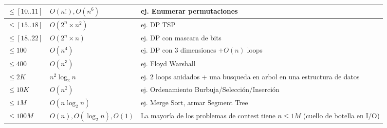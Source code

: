 \begin{center}
\footnotesize
{
  \begin{xtabular}{|C{.15\columnwidth}|C{.25\columnwidth}|L{.55\columnwidth}|}
  \texttt{$\leq[10..11]$}  & \texttt{$O(n!),O(n^6)$}         & ej. Enumerar permutaciones                                                         \\ \hline
  \texttt{$\leq[15..18]$}  & \texttt{$O(2^n\times n^2)$}     & ej. DP TSP                                                                         \\ \hline
  \texttt{$\leq[18..22]$}  & \texttt{$O(2^n\times n)$}       & ej. DP con mascara de bits                                                         \\ \hline
  \texttt{$\leq100$}       & \texttt{$O(n^4)$}               & ej. DP con 3 dimensiones $+ O(n)$ loops                                            \\ \hline
  \texttt{$\leq400$}       & \texttt{$O(n^3)$}               & ej. Floyd Warshall                                                                 \\ \hline
  \texttt{$\leq2K$}        & \texttt{$n^2\log_2n$}           & ej. 2 loops anidados + una busqueda en arbol en una estructura de datos            \\ \hline
  \texttt{$\leq10K$}       & \texttt{$O(n^2)$}               & ej. Ordenamiento Burbuja/Selecci\'on/Inserci\'on                                   \\ \hline
  \texttt{$\leq1M$}        & \texttt{$O(n\log_2n)$}          & ej. Merge Sort, armar Segment Tree                                                 \\ \hline
  \texttt{$\leq100M$}      & \texttt{$O(n),O(\log_2n),O(1)$} & La mayor\'ia de los problemas de contest tiene $n\leq1M$ (cuello de botella en I/O)\\ \hline
  \end{xtabular}
}
\end{center}

  